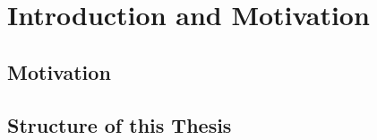 \chapter{Introduction and Motivation}
\label{ch:introduction}


\section{Motivation}
\label{sec:motivation}





\section{Structure of this Thesis}

